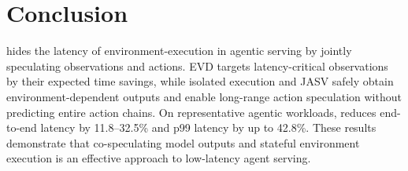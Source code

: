 \section{Conclusion}

\sysname{} hides the latency of environment-execution in agentic serving by jointly
speculating observations and actions. 
EVD targets latency-critical observations
by their expected time savings, while isolated execution and JASV safely obtain environment-dependent outputs and enable long-range action speculation without predicting entire action chains. 
On representative agentic workloads, \sysname{} reduces end-to-end latency by 11.8--32.5\% and p99 latency by up to 42.8\%.
These results demonstrate that co-speculating model outputs and stateful environment execution is an effective approach to low-latency agent serving.
